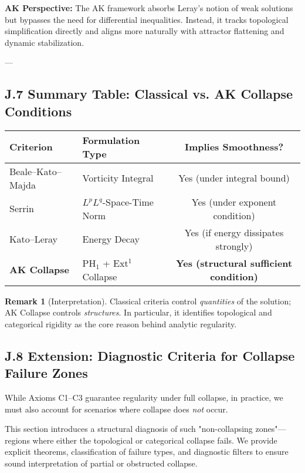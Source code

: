 \documentclass[11pt]{article}
\theoremstyle{definition}
\newtheorem{remark}[theorem]{Remark}
\begin{document}
\textbf{AK Perspective:}  
The AK framework absorbs Leray’s notion of weak solutions but bypasses the need for differential inequalities.  
Instead, it tracks topological simplification directly and aligns more naturally with attractor flattening and dynamic stabilization.

---

\subsection*{J.7 Summary Table: Classical vs. AK Collapse Conditions}

\begin{center}
\renewcommand{\arraystretch}{1.4}
\begin{tabular}{|l|l|c|}
\hline
\textbf{Criterion} & \textbf{Formulation Type} & \textbf{Implies Smoothness?} \\
\hline
Beale--Kato--Majda & Vorticity Integral & Yes (under integral bound) \\
Serrin & \( L^pL^q \)-Space-Time Norm & Yes (under exponent condition) \\
Kato--Leray & Energy Decay & Yes (if energy dissipates strongly) \\
\hline
\textbf{AK Collapse} & PH$_1$ + Ext$^1$ Collapse & \textbf{Yes (structural sufficient condition)} \\
\hline
\end{tabular}
\end{center}

\begin{remark}[Interpretation]
Classical criteria control \emph{quantities} of the solution; AK Collapse controls \emph{structures}.  
In particular, it identifies topological and categorical rigidity as the core reason behind analytic regularity.
\end{remark}

\subsection*{J.8 Extension: Diagnostic Criteria for Collapse Failure Zones}

While Axioms C1–C3 guarantee regularity under full collapse,  
in practice, we must also account for scenarios where collapse does \emph{not} occur.

This section introduces a structural diagnosis of such "non-collapsing zones"—regions where either the topological or categorical collapse fails.  
We provide explicit theorems, classification of failure types, and diagnostic filters to ensure sound interpretation of partial or obstructed collapse.
\end{document}
